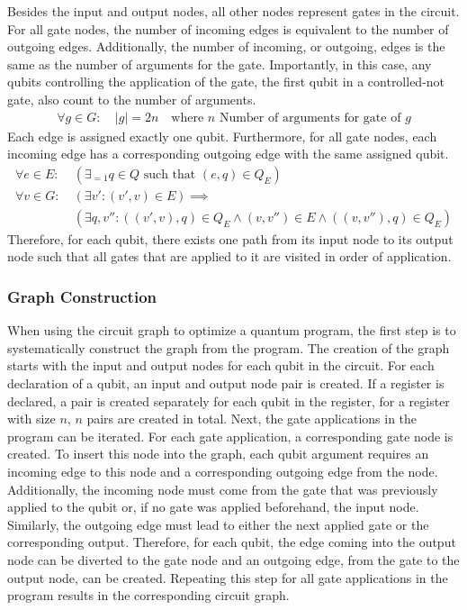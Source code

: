 Besides the input and output nodes, all other nodes represent gates in the circuit. For all gate nodes, the number of incoming edges is equivalent to the number of outgoing edges. Additionally, the number of incoming, or outgoing, edges is the same as the number of arguments for the gate. 
Importantly, in this case, any qubits controlling the application of the gate, \eg the first qubit in a controlled-not gate, also count to the number of arguments. 
\begin{align*}
    \forall g \in G :\ & |g| = 2n \quad \text{where } n \text{ Number of arguments for gate of } g
\end{align*}
Each edge is assigned exactly one qubit. Furthermore, for all gate nodes, each incoming edge has a corresponding outgoing edge with the same assigned qubit.
\begin{align*}
    \forall e \in E :\ & (\exists_{=1} q \in Q \text{ such that } (e, q) \in Q_E)\\
    \forall v \in G :\ & (\exists v': (v', v) \in E) \implies\\
    & (\exists q, v'' : ((v', v), q) \in Q_E \land (v, v'') \in E \land ((v, v''), q) \in Q_E)
\end{align*}
Therefore, for each qubit, there exists one path from its input node to its output node such that all gates that are applied to it are visited in order of application.

\subsubsection{Graph Construction}
When using the circuit graph to optimize a quantum program, the first step is to systematically construct the graph from the program. The creation of the graph starts with the input and output nodes for each qubit in the circuit. For each declaration of a qubit, an input and output node pair is created. If a register is declared, a pair is created separately for each qubit in the register, \ie for a register with size $n$, $n$ pairs are created in total. Next, the gate applications in the program can be iterated. For each gate application, a corresponding gate node is created. To insert this node into the graph, each qubit argument requires an incoming edge to this node and a corresponding outgoing edge from the node. Additionally, the incoming node must come from the gate that was previously applied to the qubit or, if no gate was applied beforehand, the input node. Similarly, the outgoing edge must lead to either the next applied gate or the corresponding output. Therefore, for each qubit, the edge coming into the output node can be diverted to the gate node and an outgoing edge, from the gate to the output node, can be created. Repeating this step for all gate applications in the program results in the corresponding circuit graph.

